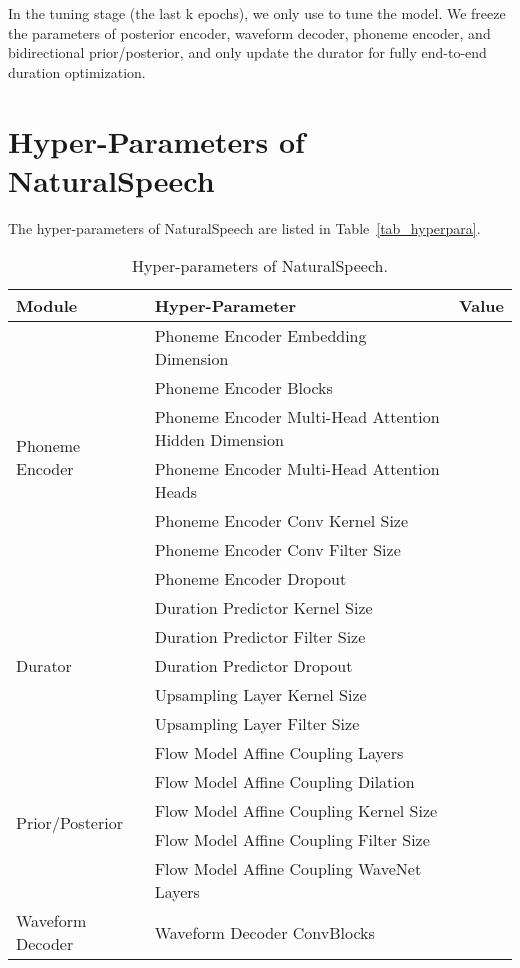 \documentclass{article}
\theoremstyle{definition}
\def\myname{NaturalSpeech}
\begin{document}
In the tuning stage (the last k epochs), we only use  to tune the model. We freeze the parameters of posterior encoder, waveform decoder, phoneme encoder, and bidirectional prior/posterior, and only update the durator for fully end-to-end duration optimization.


\section{Hyper-Parameters of \myname{}}
\label{appendix_hyperpara}
The hyper-parameters of \myname{} are listed in Table~\ref{tab_hyperpara}.


\begin{table}[h!]
\small
    \centering
    \caption{Hyper-parameters of \myname{}.}
    \begin{tabular}{llc}
    \toprule
    Module & Hyper-Parameter     &   Value  \\
    \midrule
    \multirow{7}{*}{Phoneme Encoder } & Phoneme Encoder Embedding Dimension &       \\
    &Phoneme Encoder Blocks  &  \\
    &Phoneme Encoder Multi-Head Attention Hidden Dimension &  \\
    &Phoneme Encoder Multi-Head Attention Heads &  \\
    &Phoneme Encoder Conv Kernel Size &  \\
    &Phoneme Encoder Conv Filter Size &  \\
    &Phoneme Encoder Dropout &  \\
    \midrule
    \multirow{5}{*}{Durator }&Duration Predictor Kernel Size &  \\
    &Duration Predictor Filter Size &  \\
    &Duration Predictor Dropout &  \\
    &Upsampling Layer Kernel Size &  \\
    &Upsampling Layer Filter Size &  \\
    \midrule
    \multirow{5}{*}{Prior/Posterior }&Flow Model Affine Coupling Layers &  \\
    &Flow Model Affine Coupling Dilation &  \\
    &Flow Model Affine Coupling Kernel Size &  \\
    &Flow Model Affine Coupling Filter Size &  \\
    &Flow Model Affine Coupling WaveNet Layers &  \\
    \midrule
    \multirow{6}{*}{Waveform Decoder }&Waveform Decoder ConvBlocks &  \\

\end{tabular}
\end{table}
\end{document}
